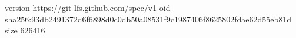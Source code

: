 version https://git-lfs.github.com/spec/v1
oid sha256:93db2491372d6f6898d0c0db50a08531f9c1987406f8625802fdae62d55eb81d
size 626416
